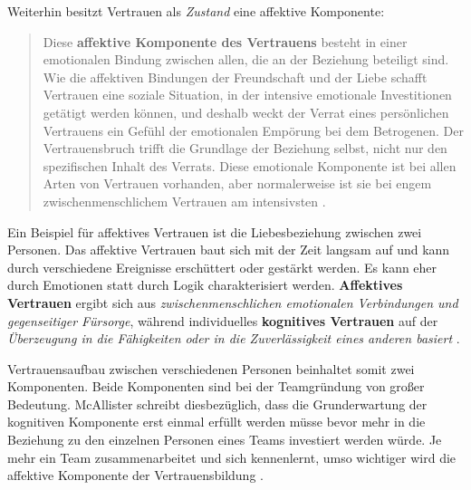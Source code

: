 \documentclass[a4paper,11pt]{article}%
\renewcommand{\\}{\vspace*{0.5\baselineskip} \newline}
\begin{document}
{Weiterhin besitzt Vertrauen als \textit{Zustand} eine affektive Komponente:
\begin{quote}
\glqq{}Diese \textbf{affektive Komponente des Vertrauens} besteht in einer emotionalen Bindung zwischen allen, die an der Beziehung beteiligt sind. Wie die affektiven Bindungen der Freundschaft und der Liebe schafft Vertrauen eine soziale Situation, in der intensive emotionale Investitionen getätigt werden können, und deshalb weckt der Verrat eines persönlichen Vertrauens ein Gefühl der emotionalen Empörung bei dem Betrogenen. Der Vertrauensbruch trifft die Grundlage der Beziehung selbst, nicht nur den spezifischen Inhalt des Verrats. Diese emotionale Komponente ist bei allen Arten von Vertrauen vorhanden, aber normalerweise ist sie bei engem zwischenmenschlichem Vertrauen am intensivsten\dq{} \citep[S. 971]{lewis1985trust}.
\end{quote}
Ein Beispiel für affektives Vertrauen ist die Liebesbeziehung zwischen zwei Personen. Das affektive Vertrauen baut sich mit der Zeit langsam auf und kann durch verschiedene Ereignisse erschüttert oder gestärkt werden. Es kann eher durch Emotionen statt durch Logik charakterisiert werden.
\textbf{Affektives Vertrauen} ergibt sich aus \textit{zwischenmenschlichen emotionalen Verbindungen und gegenseitiger Fürsorge}, während individuelles \textbf{kognitives Vertrauen} auf der \textit{Überzeugung in die Fähigkeiten oder in die Zuverlässigkeit eines anderen basiert} \citep[S. 30]{mcallister1995affect}.

Vertrauensaufbau zwischen verschiedenen Personen beinhaltet somit zwei Komponenten. Beide Komponenten sind bei der Teamgründung von großer Bedeutung. 
McAllister schreibt diesbezüglich, dass die Grunderwartung der kognitiven Komponente erst einmal erfüllt werden müsse bevor mehr in die Beziehung zu den einzelnen Personen eines Teams investiert werden würde. Je mehr ein Team zusammenarbeitet und sich kennenlernt, umso wichtiger wird die affektive Komponente der Vertrauensbildung \citep[S. 30]{mcallister1995affect}.

}
\end{document}

